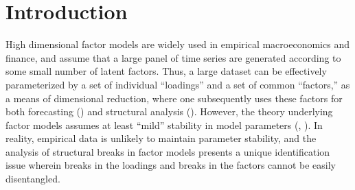 \documentclass[12pt]{article}
\def\spacingset#1{\renewcommand{\baselinestretch}%
{#1}\small\normalsize} \spacingset{1}
\theoremstyle{plain}
\numberwithin{equation}{section}
\begin{document}

\newpage
\spacingset{1.9} %

\section{Introduction}
High dimensional factor models are widely used in empirical macroeconomics and finance, and assume that a large panel of time series are generated according to some small number of latent factors. Thus, a large dataset can be effectively parameterized by a set of individual ``loadings'' and a set of common ``factors,'' as a means of dimensional reduction, where one subsequently uses these factors for both forecasting (\textcite{stock_forecasting_2002}) and structural analysis (\textcite{bernanke_measuring_2005}). However, the theory underlying factor models assumes at least ``mild'' stability in model parameters (\textcite{stock_diffusion_1998}, \textcite{bai_inferential_2003}). In reality, empirical data is unlikely to maintain parameter stability, and the analysis of structural breaks in factor models presents a unique identification issue wherein breaks in the loadings and breaks in the factors cannot be easily disentangled.
\end{document}
